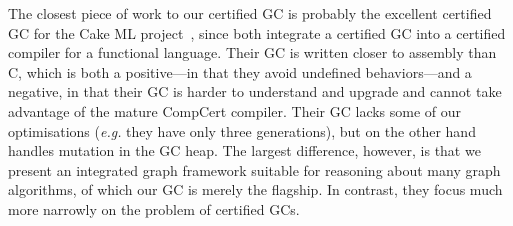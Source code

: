 The closest piece of work to our certified GC is probably the excellent certified GC
for the Cake ML project~\cite{cakemlgc}, since both integrate a certified GC into 
a certified compiler for a functional language.  Their GC is written closer to assembly 
than C, which is both a positive---in that they avoid undefined behaviors---and a negative, 
in that their GC is harder to understand and upgrade and cannot take advantage of the
mature CompCert compiler.  Their GC lacks some of our optimisations (\emph{e.g.} they have 
only three generations), but on the other hand handles mutation in the GC heap.  The largest 
difference, however, is that we present an integrated graph framework suitable for reasoning 
about many graph algorithms, of which our GC is merely the flagship.  In contrast, they focus 
much more narrowly on the problem of certified GCs.